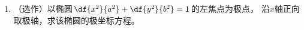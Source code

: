 \begin{ext}
\begin{enumerate}
\begin{enumerate}[(1)]
	    {\it 三维球极投影映射}，将球面上一点的坐标表示为对应二维平面
	    上的点的函数。
	  \end{enumerate}
	\begin{center}
		\quad
		
		\it \small 第4题图
	\end{center}
	\item （选作）以椭圆$\df{x^2}{a^2}+\df{y^2}{b^2}=1$的左焦点为极点，
	沿$x$轴正向取极轴，求该椭圆的极坐标方程。
	\end{enumerate}
\end{ext}

